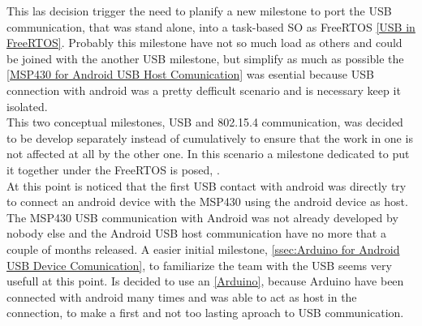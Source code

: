 	This las decision trigger the need to planify a new milestone to port the USB communication, that was stand alone, into a task-based SO as FreeRTOS \autoref{USB in FreeRTOS}. Probably this milestone have not so much load as others and could be joined with the another USB milestone, but simplify as much as possible the \autoref{MSP430 for Android USB Host Comunication} was esential because USB connection with android was a pretty defficult scenario and is necessary keep it isolated.\\

	This two conceptual milestones, USB and 802.15.4 communication, was decided to be develop separately instead of cumulatively to ensure that the work in one is not affected at all by the other one. In this scenario a milestone dedicated to put it together under the FreeRTOS is posed, .\\ %
	At this point is noticed that the first USB contact with android was directly try to connect an android device with the MSP430 using the android device as host. The MSP430 USB communication with Android was not already developed by nobody else and the Android USB host communication have no more that a couple of months released. A easier initial milestone, \autoref{ssec:Arduino for Android USB Device Comunication}, to familiarize the team with the USB seems very usefull at this point. Is decided to use an \autoref{Arduino}, because Arduino have been connected with android many times and was able to act as host in the connection, to make a first and not too lasting aproach to USB communication.

